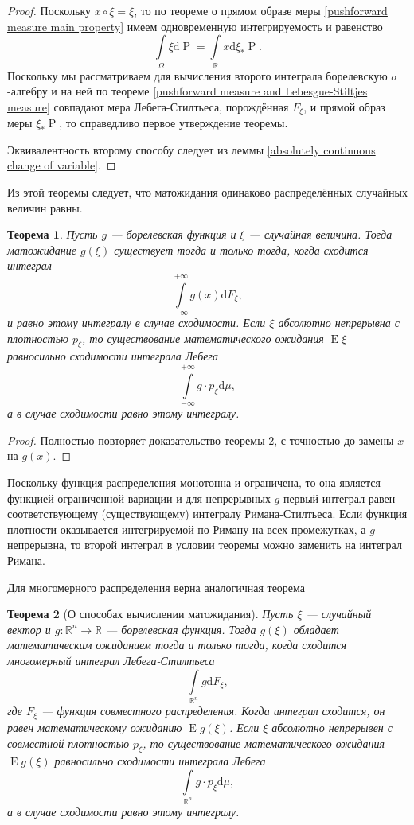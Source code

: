 \documentclass[12pt]{article}
\newtheorem{theorem}{Теорема}
\numberwithin{theorem}{section}
\theoremstyle{definition}
\newcommand{\RR}{\mathbb{R}}
\newcommand{\prob}{\operatorname{P}}
\newcommand{\expect}{\operatorname{E}}
\newcommand{\diff}{\mathrm{d}}
\begin{document}
	\begin{proof}
		Поскольку $ x \circ \xi = \xi $, то по теореме о прямом образе меры \ref{pushforward measure main property} 
		имеем одновременную интегрируемость и равенство
		$$ \int\limits_{\Omega} \xi \diff\prob = \int\limits_{\RR} x \diff \xi_*\prob. $$
		Поскольку мы рассматриваем для вычисления второго интеграла борелевскую $ \sigma $-алгебру
		и на ней по теореме \ref{pushforward measure and Lebesgue-Stiltjes measure} совпадают мера Лебега-Стилтьеса,
		порождённая $ F_\xi $, и прямой образ меры $ \xi_*\prob $, то справедливо первое утверждение теоремы.
		
		Эквивалентность второму способу следует из леммы \ref{absolutely continuous change of variable}.
	\end{proof}
	
	Из этой теоремы следует, что матожидания одинаково распределённых случайных величин равны.
	
	\begin{theorem} \label{compute expectation of composition}
		Пусть $ g $ --- борелевская функция и $ \xi $ --- случайная величина.
		Тогда матожидание $ g(\xi) $ существует тогда и только тогда,
		когда сходится интеграл
		$$ \int\limits_{-\infty}^{+\infty} g(x)\diff F_{\xi}, $$
		и равно этому интегралу в случае сходимости.
		Если $ \xi $ абсолютно непрерывна с плотностью $ p_\xi $,
		то существование математического ожидания $ \expect\xi $ равносильно сходимости интеграла Лебега
		$$ \int\limits_{-\infty}^{+\infty} g\cdot p_\xi\diff \mu, $$
		а в случае сходимости равно этому интегралу.
	\end{theorem}
	
	\begin{proof}
		Полностью повторяет доказательство теоремы \ref{compute expectation}, с точностью до замены $ x $ на $ g(x) $.
	\end{proof}
	
	Поскольку функция распределения монотонна и ограничена, то она является функцией ограниченной вариации и для непрерывных $ g $
	первый интеграл равен соответствующему (существующему) интегралу Римана-Стилтьеса. Если функция плотности оказывается интегрируемой по Риману на всех промежутках, а $ g $ непрерывна, то второй интеграл в условии теоремы можно заменить на интеграл Римана.
	
	Для многомерного распределения верна аналогичная теорема
	
	\begin{theorem}[О способах вычислении матожидания] \label{compute expectation}
		Пусть $ \xi $ --- случайный вектор и $ g \colon \RR^n \to \RR $ --- борелевская функция.
		Тогда $ g(\xi) $ обладает математическим ожиданием тогда и только тогда,
		когда сходится многомерный интеграл Лебега-Стилтьеса
		$$ \int\limits_{\RR^n} g\diff F_{\xi}, $$
		где $ F_\xi $ --- функция совместного распределения.
		Когда интеграл сходится, он равен математическому ожиданию $ \expect g(\xi) $.
		Если $ \xi $ абсолютно непрерывен с совместной плотностью $ p_\xi $,
		то существование математического ожидания $ \expect g(\xi) $ равносильно сходимости интеграла Лебега
		$$ \int\limits_{\RR^n} g \cdot p_\xi\diff \mu, $$
		а в случае сходимости равно этому интегралу.
	\end{theorem}
	
\end{document}
